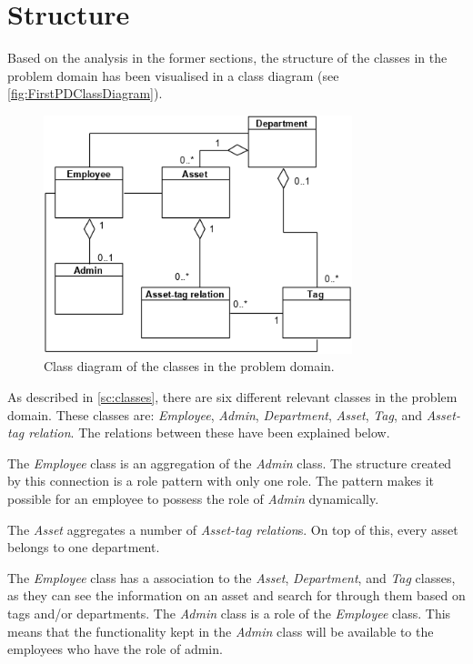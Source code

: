 \section{Structure}\label{sc:structure}
Based on the analysis in the former sections, the structure of the classes in the problem domain has been visualised in a class diagram (see \autoref{fig:FirstPDClassDiagram}).

\begin{figure}[H]
    \centering
    \includegraphics[width=0.8\textwidth]{figures/ClassDiagrams/Class_activity_class_diagram.png}
    \caption{Class diagram of the classes in the problem domain.}
    \label{fig:FirstPDClassDiagram}
\end{figure}

As described in \autoref{sc:classes}, there are six different relevant classes in the problem domain. These classes are: \textit{Employee}, \textit{Admin}, \textit{Department}, \textit{Asset}, \textit{Tag}, and \textit{Asset-tag relation}. The relations between these have been explained below.
\par

The \textit{Employee} class is an aggregation of the \textit{Admin} class. The structure created by this connection is a role pattern with only one role. The pattern makes it possible for an employee to possess the role of \textit{Admin} dynamically.
\par

The \textit{Asset} aggregates a number of \textit{Asset-tag relation}s. On top of this, every asset belongs to one department.
\par

The \textit{Employee} class has a association to the \textit{Asset}, \textit{Department}, and \textit{Tag} classes, as they can see the information on an asset and search for through them based on tags and/or departments. The \textit{Admin} class is a role of the \textit{Employee} class. This means that the functionality kept in the \textit{Admin} class will be available to the employees who have the role of admin.
\par

